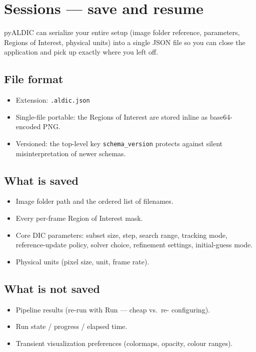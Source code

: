 \section{Sessions --- save and resume}
\label{sec:session}

pyALDIC can serialize your entire setup (image folder reference,
parameters, Regions of Interest, physical units) into a single
JSON file so you can close the application and pick up exactly
where you left off.

\subsection{File format}

\begin{itemize}
  \item Extension: \texttt{.aldic.json}
  \item Single-file portable: the Regions of Interest are stored
        inline as base64-encoded PNG.
  \item Versioned: the top-level key \texttt{schema\_version}
        protects against silent misinterpretation of newer schemas.
\end{itemize}

\subsection{What is saved}

\begin{itemize}
  \item Image folder path and the ordered list of filenames.
  \item Every per-frame Region of Interest mask.
  \item Core DIC parameters: subset size, step, search range,
        tracking mode, reference-update policy, solver choice,
        refinement settings, initial-guess mode.
  \item Physical units (pixel size, unit, frame rate).
\end{itemize}

\subsection{What is not saved}

\begin{itemize}
  \item Pipeline results (re-run with Run --- cheap vs.\ re-
        configuring).
  \item Run state / progress / elapsed time.
  \item Transient visualization preferences (colormaps, opacity,
        colour ranges).
\end{itemize}

